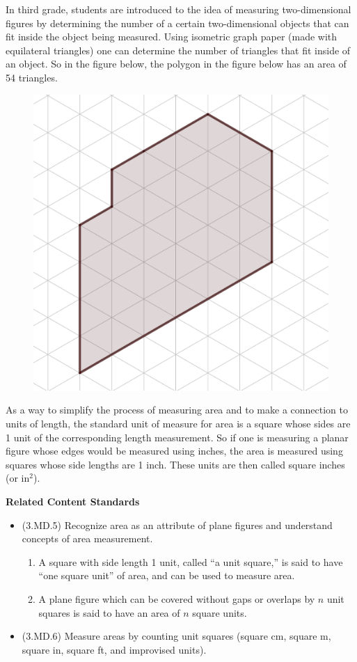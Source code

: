 \documentclass[
]{book}
\providecommand{\tightlist}{%
  \setlength{\itemsep}{0pt}\setlength{\parskip}{0pt}}
\newenvironment{standards}{}{}
\theoremstyle{definition}
\theoremstyle{definition}
\theoremstyle{definition}
\theoremstyle{definition}
\theoremstyle{remark}
\begin{document}
In third grade, students are introduced to the idea of measuring two-dimensional figures by determining the number of a certain two-dimensional objects that can fit inside the object being measured. Using isometric graph paper (made with equilateral triangles) one can determine the number of triangles that fit inside of an object. So in the figure below, the polygon in the figure below has an area of 54 triangles.

\begin{figure}

{\centering \includegraphics[width=0.4\linewidth]{images/isometric_graph} 

}

\end{figure}

As a way to simplify the process of measuring area and to make a connection to units of length, the standard unit of measure for area is a square whose sides are 1 unit of the corresponding length measurement. So if one is measuring a planar figure whose edges would be measured using inches, the area is measured using squares whose side lengths are 1 inch. These units are then called square inches (or in\(^2\)).

\begin{standards}

\begin{center}
\textbf{Related Content Standards}

\end{center}

\begin{itemize}
\tightlist
\item
  (3.MD.5) Recognize area as an attribute of plane figures and understand concepts of area measurement.

  \begin{enumerate}
  \def\labelenumi{\alph{enumi})}
  \tightlist
  \item
    A square with side length 1 unit, called ``a unit square,'' is said to have ``one square unit'' of area, and can be used to measure area.
  \item
    A plane figure which can be covered without gaps or overlaps by \(n\) unit squares is said to have an area of \(n\) square units.
  \end{enumerate}
\item
  (3.MD.6) Measure areas by counting unit squares (square cm, square m, square in, square ft, and improvised units).
\end{itemize}

\end{standards}
\end{document}
